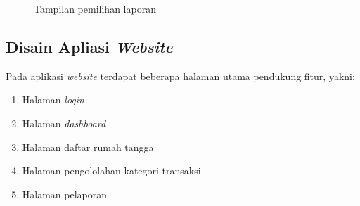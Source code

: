 \begin{figure}
\centering
{}
\caption[Tampilan pemilihan laporan]{Tampilan pemilihan laporan} 
\label{fig:design_app_pemilihan_laporan}
\end{figure}

\subsection{Disain Apliasi \textit{Website}}
\label{subsec:disainaplikasiwebsite}

\hspace{0,5cm}Pada aplikasi \textit{website} terdapat beberapa halaman utama pendukung fitur, yakni;
\begin{enumerate}
	\item Halaman \textit{login}
	\item Halaman \textit{dashboard}
	\item Halaman daftar rumah tangga
	\item Halaman pengololahan kategori transaksi
	\item Halaman pelaporan
\end{enumerate}

